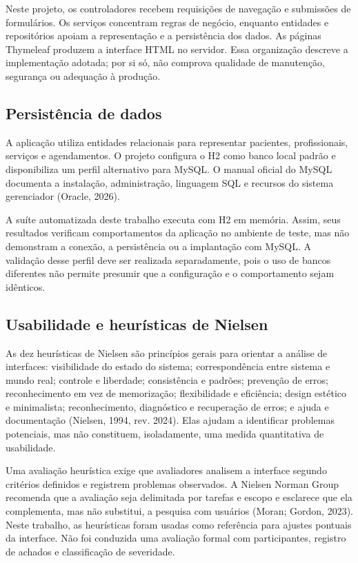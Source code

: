 \documentclass[12pt,a4paper]{article}
\begin{document}
Neste projeto, os controladores recebem requisições de navegação e submissões de formulários. Os serviços concentram regras de negócio, enquanto entidades e repositórios apoiam a representação e a persistência dos dados. As páginas Thymeleaf produzem a interface HTML no servidor. Essa organização descreve a implementação adotada; por si só, não comprova qualidade de manutenção, segurança ou adequação à produção.

\subsection{Persistência de dados}

A aplicação utiliza entidades relacionais para representar pacientes, profissionais, serviços e agendamentos. O projeto configura o H2 como banco local padrão e disponibiliza um perfil alternativo para MySQL. O manual oficial do MySQL documenta a instalação, administração, linguagem SQL e recursos do sistema gerenciador (Oracle, 2026).

A suíte automatizada deste trabalho executa com H2 em memória. Assim, seus resultados verificam comportamentos da aplicação no ambiente de teste, mas não demonstram a conexão, a persistência ou a implantação com MySQL. A validação desse perfil deve ser realizada separadamente, pois o uso de bancos diferentes não permite presumir que a configuração e o comportamento sejam idênticos.

\subsection{Usabilidade e heurísticas de Nielsen}

As dez heurísticas de Nielsen são princípios gerais para orientar a análise de interfaces: visibilidade do estado do sistema; correspondência entre sistema e mundo real; controle e liberdade; consistência e padrões; prevenção de erros; reconhecimento em vez de memorização; flexibilidade e eficiência; design estético e minimalista; reconhecimento, diagnóstico e recuperação de erros; e ajuda e documentação (Nielsen, 1994, rev. 2024). Elas ajudam a identificar problemas potenciais, mas não constituem, isoladamente, uma medida quantitativa de usabilidade.

Uma avaliação heurística exige que avaliadores analisem a interface segundo critérios definidos e registrem problemas observados. A Nielsen Norman Group recomenda que a avaliação seja delimitada por tarefas e escopo e esclarece que ela complementa, mas não substitui, a pesquisa com usuários (Moran; Gordon, 2023). Neste trabalho, as heurísticas foram usadas como referência para ajustes pontuais da interface. Não foi conduzida uma avaliação formal com participantes, registro de achados e classificação de severidade.
\end{document}
